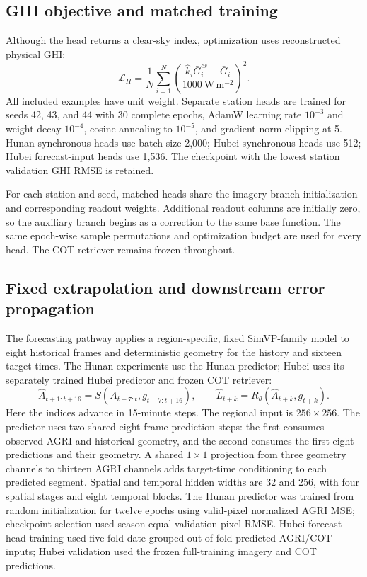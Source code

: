 \documentclass[11pt]{article}
\begin{document}
\subsection{GHI objective and matched training}
Although the head returns a clear-sky index, optimization uses reconstructed physical GHI:
\begin{equation}
\mathcal L_H=\frac{1}{N}\sum_{i=1}^{N}
\left(\frac{\widehat k_i\bar G^{cs}_i-\bar G_i}
{1000\ \mathrm{W\,m^{-2}}}\right)^2 .
\label{eq:ghi-loss}
\end{equation}
All included examples have unit weight. Separate station heads are trained for seeds 42, 43, and 44 with 30 complete epochs, AdamW learning rate $10^{-3}$ and weight decay $10^{-4}$, cosine annealing to $10^{-5}$, and gradient-norm clipping at 5. Hunan synchronous heads use batch size 2,000; Hubei synchronous heads use 512; Hubei forecast-input heads use 1,536. The checkpoint with the lowest station validation GHI RMSE is retained.

For each station and seed, matched heads share the imagery-branch initialization and corresponding readout weights. Additional readout columns are initially zero, so the auxiliary branch begins as a correction to the same base function. The same epoch-wise sample permutations and optimization budget are used for every head. The COT retriever remains frozen throughout.

\subsection{Fixed extrapolation and downstream error propagation}
The forecasting pathway applies a region-specific, fixed SimVP-family model \cite{simvp,simvpv2} to eight historical frames and deterministic geometry for the history and sixteen target times. The Hunan experiments use the Hunan predictor; Hubei uses its separately trained Hubei predictor and frozen COT retriever:
\begin{equation}
\widehat A_{t+1:t+16}=S(A_{t-7:t},g_{t-7:t+16}),
\qquad
\widehat L_{t+k}=R_\theta(\widehat A_{t+k},g_{t+k}).
\label{eq:forecast}
\end{equation}
Here the indices advance in 15-minute steps. The regional input is $256\times256$. The predictor uses two shared eight-frame prediction steps: the first consumes observed AGRI and historical geometry, and the second consumes the first eight predictions and their geometry. A shared $1\times1$ projection from three geometry channels to thirteen AGRI channels adds target-time conditioning to each predicted segment. Spatial and temporal hidden widths are 32 and 256, with four spatial stages and eight temporal blocks. The Hunan predictor was trained from random initialization for twelve epochs using valid-pixel normalized AGRI MSE; checkpoint selection used season-equal validation pixel RMSE. Hubei forecast-head training used five-fold date-grouped out-of-fold predicted-AGRI/COT inputs; Hubei validation used the frozen full-training imagery and COT predictions.
\end{document}
